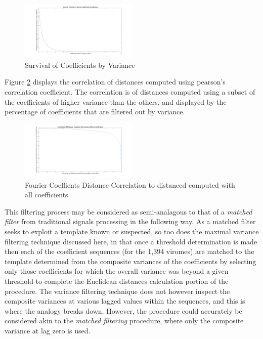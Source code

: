 \begin{figure}[h!] 
\includegraphics[width=0.5\textwidth]{Images/Files/FCoeff_var_surv.png}
\caption{Survival of Coefficients by Variance\label{fig:coeffvarsurv}}
\end{figure} 

Figure \ref{fig:coeffcorrfilt} displays the correlation of distances computed using pearson's correlation coefficient. 
The correlation is of distances computed using a subset of the coefficients of higher variance than the others, and 
displayed by the percentage of coefficients that are filtered out by variance. 

\begin{figure}[h!] 
\includegraphics[width=0.5\textwidth]{Images/Files/FCoeff_Correlation_For_Filtered.png}
\caption{ Fourier Coeffients Distance Correlation to distanced computed with all coefficients\label{fig:coeffcorrfilt}} 
\end{figure} 

This filtering process may be considered as semi-analagous to that of a \textit{matched filter} from 
traditional signals processing in the following way.  As a matched filter seeks to exploit a template 
known or suspected, so too does the maximal variance filtering technique discussed here, in that once 
a threshold determination is made then each of the coefficient sequences (for the 1,394 viromes) are
matched to the template determined from the composite variances of the coefficients by selecting only 
those coefficients for which the overall variance was beyond a given threshold to complete the 
Euclidean distances calculation portion of the procedure.  The variance filtering technique does not 
however inspect the composite variances at various lagged values within the sequences, and this is 
where the analogy breaks down.  However, the procedure could accurately be considered akin to the 
\textit{matched filtering} procedure, where only the composite variance at lag zero is used. 

